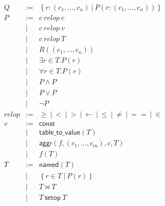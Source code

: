 \documentclass[letter, notitlepage]{article}
\begin{document}
\[
\begin{array}{rcl}
Q & := & \left\{r:(c_1,...,c_n) ~|~ P(r:(c_1,...,c_n)) \right\}\\
P &:= & c~\mathit{relop}~c \\
	& | & c~\mathit{relop}~v\\
	& | & c~\mathit{relop}~T\\
	& | & R((c_1,...,c_n))\\
	& | & \exists r\in T. P(r)\\
	& | & \forall r\in T. P(r)\\
	& | & P \land P\\
	& | & P \lor P\\
	& | & \neg P\\
\mathit{relop} &:=& \ge ~|~ < ~|~ > ~|~ \leftarrow ~|~ \le ~|~ \neq ~|~ == ~|~ \in \\
v &:= & \mathsf{const} \\
	& | & \mathsf{table\_to\_value}(T)\\
	& | & \mathsf{aggr}(f, (c_1,...,c_m), c, T)\\
	& | & f(T)\\
T &:= &\mathsf{named}(T)\\
	& | & \left\{r\in T ~|~ P(r)\right\}\\
	& | & T \bowtie T\\
	& | & T~\mathsf{setop}~T
\end{array}
\]
\end{document}
